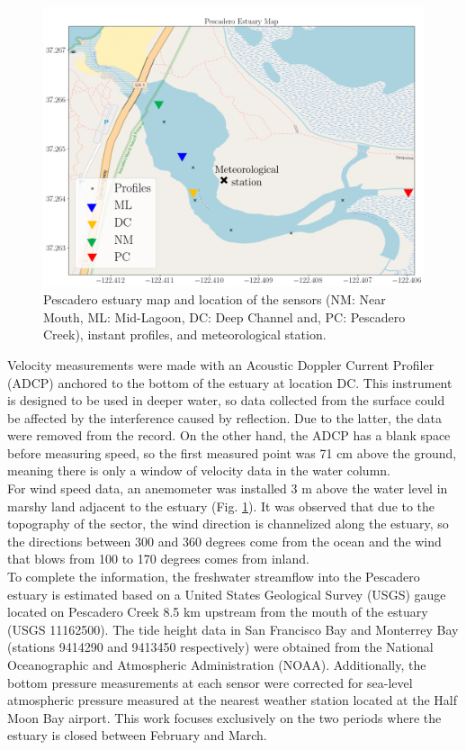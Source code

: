 \documentclass[11pt,letterpaper]{article}
\begin{document}
\begin{figure}[h!]
    \centering
    \includegraphics[scale=0.6]{Imagenes/mapa2.png}
    \caption{Pescadero estuary map and location of the sensors (NM: Near Mouth, ML: Mid-Lagoon, DC: Deep Channel and, PC: Pescadero Creek), instant profiles, and meteorological station. }
    \label{fig:mapPDO}
\end{figure}

Velocity measurements were made with an Acoustic Doppler Current Profiler (ADCP) anchored to the bottom of the estuary at location DC. This instrument is designed to be used in deeper water, so data collected from the surface could be affected by the interference caused by reflection. Due to the latter, the data were removed from the record. On the other hand, the ADCP has a blank space before measuring speed, so the first measured point was 71 cm above the ground, meaning there is only a window of velocity data in the water column. \\

For wind speed data, an anemometer was installed 3 m above the water level in marshy land adjacent to the estuary (Fig. \ref{fig:mapPDO}). It was observed that due to the topography of the sector, the wind direction is channelized along the estuary, so the directions between 300 and 360 degrees come from the ocean and the wind that blows from 100 to 170 degrees comes from inland.\\

To complete the information, the freshwater streamflow into the Pescadero estuary is estimated based on a United States Geological Survey (USGS) gauge located on Pescadero Creek 8.5 km upstream from the mouth of the estuary (USGS 11162500). The tide height data in San Francisco Bay and Monterrey Bay (stations 9414290 and 9413450 respectively) were obtained from the National Oceanographic and Atmospheric Administration (NOAA). Additionally, the bottom pressure measurements at each sensor were corrected for sea-level atmospheric pressure measured at the nearest weather station located at the Half Moon Bay airport. This work focuses exclusively on the two periods where the estuary is closed between February and March.\\
\end{document}
